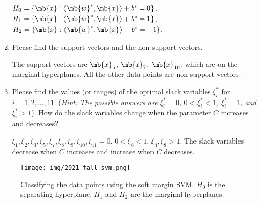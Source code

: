 \begin{exercise}
\begin{enumerate}[resume]
            \begin{solution}
                $H_0 = \{\mb{x}: \left\langle\mb{w}^*,\mb{x}\right\rangle + b^* = 0\}$. $H_1 = \{\mb{x}: \left\langle\mb{w}^*,\mb{x}\right\rangle + b^* = 1\}$. $H_2 = \{\mb{x}: \left\langle\mb{w}^*,\mb{x}\right\rangle + b^* = -1\}$.
                \qedhere
            \end{solution}

        \item Please find the support vectors and the non-support vectors.

            \begin{solution}
                The support vectors are $\mb{x}_5$, $\mb{x}_7$, $\mb{x}_{10}$, which are on the marginal hyperplanes. All the other data points are non-support vectors.
                \qedhere
            \end{solution}

        \item Please find the values (or ranges) of the optimal slack variables $\xi_i^*$ for $i=1,2,\dots,11$. (\textit{Hint: The possible answers are $\xi_i^*=0$, $0<\xi_i^*<1$, $\xi_i^*=1$, and $\xi_i^*>1$}). How do the slack variables change when the parameter $C$ increases and decreases?

            \begin{solution}
                $\xi_1, \xi_2, \xi_3, \xi_5, \xi_7, \xi_8, \xi_9, \xi_{10}, \xi_{11} = 0$. $0 < \xi_6 < 1$. $\xi_4, \xi_8 > 1$. The slack variables decrease when $C$ increases and increase when $C$ decreases.
                \qedhere
            \end{solution}
    \end{enumerate}

\end{exercise}
\begin{figure}[H]
    \centering
    \texttt{[image: img/2021\_fall\_svm.png]}
    \caption{Classifying the data points using the soft margin SVM. $H_0$ is the separating hyperplane. $H_1$ and $H_2$ are the marginal hyperplanes.}
    \label{svm}
\end{figure}
\clearpage




